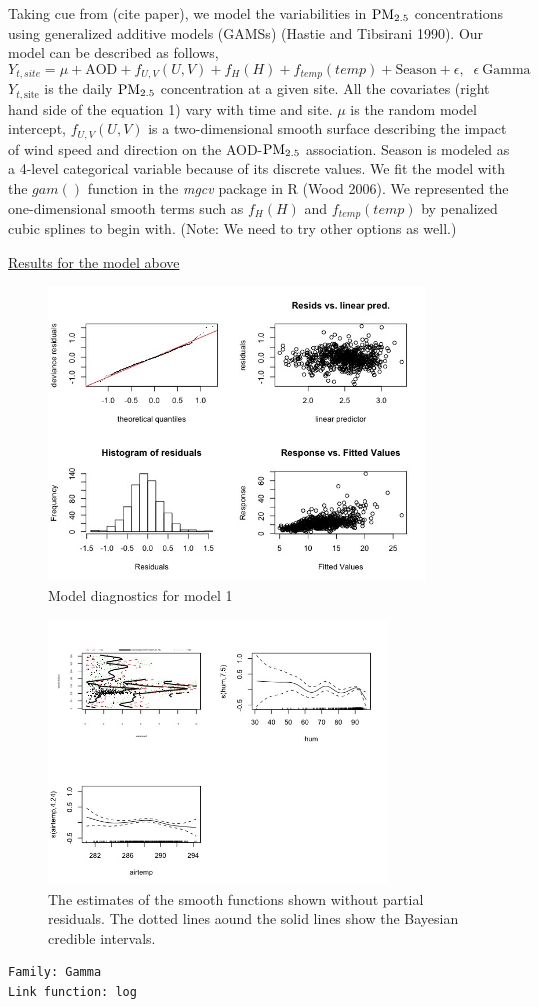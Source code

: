\documentclass[10pt]{article}
\begin{document}
\begin{itemize}
Taking cue from (cite paper), we model the variabilities in ${\mathrm{PM_{2.5}}}$ concentrations using generalized additive models (GAMSs) (Hastie and Tibsirani 1990). Our model can be described as follows, 
\begin{equation} 
Y_{t,site} = \mu + \text{AOD} + f_{U,V}(U,V) + f_{H}(H) + f_{temp}(temp) + \text{Season} +  \epsilon, \;\; \epsilon ~ \text{Gamma}
\end{equation} 
$Y_{t, \text{site}}$ is the daily ${\mathrm{PM_{2.5}}}$ concentration at a given site. All the covariates (right hand side of the equation 1) vary with time and site. $\mu$ is the random model intercept, $f_{U,V}(U,V)$ is a two-dimensional smooth surface describing the impact of wind speed and direction on the AOD-${\mathrm{PM_{2.5}}}$ association. Season is modeled as a 4-level categorical variable because of its discrete values. We fit the model with the $gam()$ function in the {\textit{mgcv}} package in R (Wood 2006). We represented the one-dimensional smooth terms such as $f_{H}(H)$ and $f_{temp}(temp)$ by penalized cubic splines to begin with. (Note: We need to try other options as well.)

\underline{Results for the model above} 
\begin{figure}[h]
\centering 
\includegraphics[width = 100mm]{cali_diag.jpeg}
\caption{Model diagnostics for model 1}
\end{figure}

\begin{figure}[h]
\centering
\includegraphics[width = 90mm]{cov_splines.jpeg} 
\caption{The estimates of the smooth functions shown without partial residuals. The dotted lines aound the solid lines show the Bayesian credible intervals.} 
\end{figure} 
\begin{verbatim} 
Family: Gamma 
Link function: log 


\end{verbatim}
\end{itemize}
\end{document}
